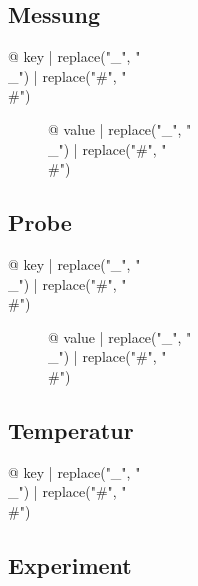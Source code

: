 \begin{multicols}{2}

\subsection{Messung}

\begin{description}
\item[{@ key | replace("_", "\\_") | replace("#", "\\#") }] {@ value | replace("_", "\\_") | replace("#", "\\#") }
\end{description}

\subsection{Probe}

\begin{description}
\item[{@ key | replace("_", "\\_") | replace("#", "\\#") }] {@ value | replace("_", "\\_") | replace("#", "\\#") }
\end{description}

\subsection{Temperatur}

\begin{description}
\item[{@ key | replace("_", "\\_") | replace("#", "\\#") }] %
\end{description}

\subsection{Experiment}


\end{multicols}
